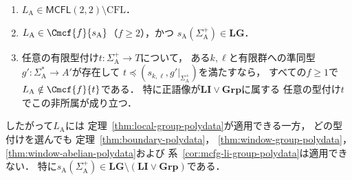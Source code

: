 \begin{proposition}
\label{prop:lg-needed-target}
\begin{enumerate}[label=\textup{(\roman*)},leftmargin=*]
\item $L_{\mathrm A}\in\mathsf{MCFL}(2,2)\setminus\mathrm{CFL}$．
\item $L_{\mathrm A}\in\Cmcf{f}{s_{\mathrm A}}$（$f\ge2$），かつ
$s_{\mathrm A}(\Sigma_{\mathrm A}^+)\in\mathbf{LG}$．
\item 任意の有限型付け$t:\Sigma_{\mathrm A}^+\to T$について，
ある$k,\ell$と有限群への準同型
$g':\Sigma_{\mathrm A}^*\to A'$が存在して
$t\preceq(s_{k,\ell},g'|_{\Sigma_{\mathrm A}^+})$を満たすなら，
すべての$f\ge1$で$L_{\mathrm A}\notin\Cmcf{f}{t}$である．
特に正語像が$\mathbf{LI}\vee\mathbf{Grp}$に属する
任意の型付け$t$でこの非所属が成り立つ．
\end{enumerate}
したがって$L_{\mathrm A}$には
定理~\ref{thm:local-group-polydata}が適用できる一方，
どの型付けを選んでも
定理~\ref{thm:boundary-polydata}，
\ref{thm:window-group-polydata}，
\ref{thm:window-abelian-polydata}および
系~\ref{cor:mcfg-li-group-polydata}は適用できない．
特に$s_{\mathrm A}(\Sigma_{\mathrm A}^+)\in
\mathbf{LG}\setminus(\mathbf{LI}\vee\mathbf{Grp})$である．
\end{proposition}
